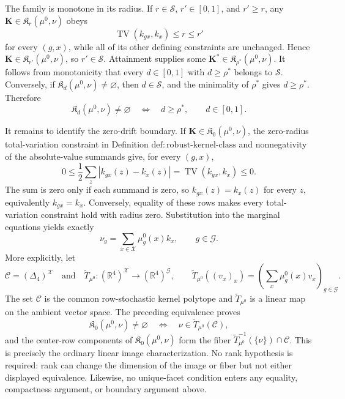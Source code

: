 The family is monotone in its radius.  If \(r\in\mathcal S\), \(r'\in[0,1]\), and \(r'\ge r\), any \(\mathbf K\in\mathfrak K_r(\mu^0,\nu)\) obeys
\[
 \operatorname{TV}(k_{gx},k_x)\le r\le r'
\]
for every \((g,x)\), while all of its other defining constraints are unchanged.  Hence \(\mathbf K\in\mathfrak K_{r'}(\mu^0,\nu)\), so \(r'\in\mathcal S\).  Attainment supplies some \(\mathbf K^*\in\mathfrak K_{\rho^*}(\mu^0,\nu)\).  It follows from monotonicity that every \(d\in[0,1]\) with \(d\ge\rho^*\) belongs to \(\mathcal S\).  Conversely, if \(\mathfrak K_d(\mu^0,\nu)\ne\varnothing\), then \(d\in\mathcal S\), and the minimality of \(\rho^*\) gives \(d\ge\rho^*\).  Therefore
\[
 \mathfrak K_d(\mu^0,\nu)\ne\varnothing
 \quad\Longleftrightarrow\quad d\ge\rho^*,
 \qquad d\in[0,1].
\]

It remains to identify the zero-drift boundary.  If \(\mathbf K\in\mathfrak K_0(\mu^0,\nu)\), the zero-radius total-variation constraint in Definition \(\mathrm{def:robust\mbox{-}kernel\mbox{-}class}\) and nonnegativity of the absolute-value summands give, for every \((g,x)\),
\[
 0\le\frac12\sum_z|k_{gx}(z)-k_x(z)|
 =\operatorname{TV}(k_{gx},k_x)\le0.
\]
The sum is zero only if each summand is zero, so \(k_{gx}(z)=k_x(z)\) for every \(z\), equivalently \(k_{gx}=k_x\).  Conversely, equality of these rows makes every total-variation constraint hold with radius zero.  Substitution into the marginal equations yields exactly
\[
 \nu_g=\sum_{x\in\mathcal X}\mu_g^0(x)k_x,
 \qquad g\in\mathcal G.
\]
More explicitly, let
\[
 \mathcal C=(\Delta_4)^{\mathcal X}
 \quad\text{and}\quad
 \widetilde T_{\mu^0}:(\mathbb R^4)^{\mathcal X}
 \longrightarrow(\mathbb R^4)^{\mathcal G},
 \qquad
 \widetilde T_{\mu^0}((v_x)_x)
 =\left(\sum_x\mu_g^0(x)v_x\right)_{g\in\mathcal G}.
\]
The set \(\mathcal C\) is the common row-stochastic kernel polytope and \(\widetilde T_{\mu^0}\) is a linear map on the ambient vector space.  The preceding equivalence proves
\[
 \mathfrak K_0(\mu^0,\nu)\ne\varnothing
 \quad\Longleftrightarrow\quad
 \nu\in \widetilde T_{\mu^0}(\mathcal C),
\]
and the center-row components of \(\mathfrak K_0(\mu^0,\nu)\) form the fiber \(\widetilde T_{\mu^0}^{-1}(\{\nu\})\cap\mathcal C\).  This is precisely the ordinary linear image characterization.  No rank hypothesis is required: rank can change the dimension of the image or fiber but not either displayed equivalence.  Likewise, no unique-facet condition enters any equality, compactness argument, or boundary argument above.